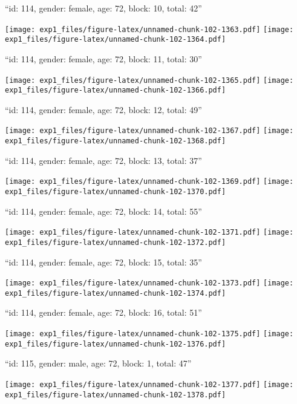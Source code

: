 \documentclass[11pt,,]{article}
\begin{document}
\newpage
[1] 

``id: 114, gender: female, age: 72, block: 10, total: 42''

\texttt{[image: exp1\_files/figure-latex/unnamed-chunk-102-1363.pdf]}
\texttt{[image: exp1\_files/figure-latex/unnamed-chunk-102-1364.pdf]}

\newpage
[1] 

``id: 114, gender: female, age: 72, block: 11, total: 30''

\texttt{[image: exp1\_files/figure-latex/unnamed-chunk-102-1365.pdf]}
\texttt{[image: exp1\_files/figure-latex/unnamed-chunk-102-1366.pdf]}

\newpage
[1] 

``id: 114, gender: female, age: 72, block: 12, total: 49''

\texttt{[image: exp1\_files/figure-latex/unnamed-chunk-102-1367.pdf]}
\texttt{[image: exp1\_files/figure-latex/unnamed-chunk-102-1368.pdf]}

\newpage
[1] 

``id: 114, gender: female, age: 72, block: 13, total: 37''

\texttt{[image: exp1\_files/figure-latex/unnamed-chunk-102-1369.pdf]}
\texttt{[image: exp1\_files/figure-latex/unnamed-chunk-102-1370.pdf]}

\newpage
[1] 

``id: 114, gender: female, age: 72, block: 14, total: 55''

\texttt{[image: exp1\_files/figure-latex/unnamed-chunk-102-1371.pdf]}
\texttt{[image: exp1\_files/figure-latex/unnamed-chunk-102-1372.pdf]}

\newpage
[1] 

``id: 114, gender: female, age: 72, block: 15, total: 35''

\texttt{[image: exp1\_files/figure-latex/unnamed-chunk-102-1373.pdf]}
\texttt{[image: exp1\_files/figure-latex/unnamed-chunk-102-1374.pdf]}

\newpage
[1] 

``id: 114, gender: female, age: 72, block: 16, total: 51''

\texttt{[image: exp1\_files/figure-latex/unnamed-chunk-102-1375.pdf]}
\texttt{[image: exp1\_files/figure-latex/unnamed-chunk-102-1376.pdf]}

\newpage
[1] 

``id: 115, gender: male, age: 72, block: 1, total: 47''

\texttt{[image: exp1\_files/figure-latex/unnamed-chunk-102-1377.pdf]}
\texttt{[image: exp1\_files/figure-latex/unnamed-chunk-102-1378.pdf]}
\end{document}
